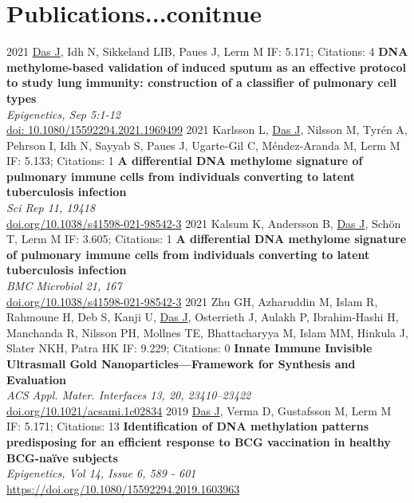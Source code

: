 \documentclass[]{friggeri-cv}
\begin{document}
\section{Publications...conitnue}
\begin{entrylist}
\entry
	{2021}
	{\underline{Das J}, Idh N, Sikkeland LIB, Paues J, Lerm M}
	{IF: 5.171; Citations: 4}
	{\textbf{DNA methylome-based validation of induced sputum as an effective protocol to study lung immunity: construction of a classifier of pulmonary cell types}\\
	\emph{Epigenetics, Sep 5:1-12}\\ \href{https://www.tandfonline.com/doi/pdf/10.1080/15592294.2021.1969499}{doi: 10.1080/15592294.2021.1969499}}
\entry
	{2021}
	{Karlsson L, \underline{Das J}, Nilsson M, Tyrén A, Pehrson I, Idh N, Sayyab S, Paues J, Ugarte-Gil C, Méndez-Aranda M, Lerm M}
	{IF: 5.133; Citations: 1}
	{\textbf{A differential DNA methylome signature of pulmonary immune cells from individuals converting to latent tuberculosis infection}\\
	\emph{Sci Rep 11, 19418}\\ \href{https://www.nature.com/articles/s41598-021-98542-3.pdf}{doi.org/10.1038/s41598-021-98542-3}}
\entry
	{2021}
	{Kalsum K, Andersson B, \underline{Das J}, Schön T, Lerm M}
	{IF: 3.605; Citations: 1}
	{\textbf{A differential DNA methylome signature of pulmonary immune cells from individuals converting to latent tuberculosis infection}\\
	\emph{BMC Microbiol 21, 167}\\ \href{https://www.nature.com/articles/s41598-021-98542-3.pdf}{doi.org/10.1038/s41598-021-98542-3}}
\entry
	{2021}
	{Zhu GH, Azharuddin M, Islam R, Rahmoune H, Deb S, Kanji U, \underline{Das J}, Osterrieth J, Aulakh P, Ibrahim-Hashi H, Manchanda R, Nilsson PH, Mollnes TE, Bhattacharyya M, Islam MM, Hinkula J, Slater NKH, Patra HK}
	{IF:  9.229; Citations: 0}
	{\textbf{Innate Immune Invisible Ultrasmall Gold Nanoparticles—Framework for Synthesis and Evaluation}\\
	\emph{ACS Appl. Mater. Interfaces 13, 20, 23410–23422}\\ \href{https://pubs.acs.org/doi/pdf/10.1021/acsami.1c02834}{doi.org/10.1021/acsami.1c02834}}
\entry	
	{2019}
	{\underline{Das J}, Verma D, Gustafsson M, Lerm M}
	{IF: 5.171; Citations: 13}
	{\textbf{Identification of DNA methylation patterns predisposing for an efficient response to BCG vaccination in healthy BCG-naïve subjects}\\
	\emph{Epigenetics, Vol 14, Issue 6, 589 - 601}\\ \href{https://www.tandfonline.com/doi/pdf/10.1080/15592294.2019.1603963?needAccess=true}{https://doi.org/10.1080/15592294.2019.1603963}}

\end{entrylist}
\end{document}
